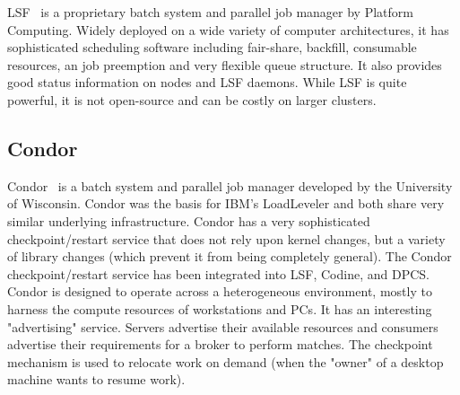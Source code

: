 LSF~\cite{LSF}
is a proprietary batch system and parallel job manager by 
Platform Computing. Widely deployed on a wide variety of computer 
architectures, it has sophisticated scheduling software including 
fair-share, backfill, consumable resources, an job preemption and 
very flexible queue structure.
It also provides good status information on nodes and LSF daemons.
While LSF is quite powerful, it is not open-source and can be costly on 
larger clusters.
%


\subsection*{Condor}

Condor~\cite{Condor,Litzkow88,Basney97}
is a batch system and parallel job manager 
developed by the University of Wisconsin. 
Condor was the basis for IBM's LoadLeveler and both share very similar 
underlying infrastructure. Condor has a very sophisticated checkpoint/restart 
service that does not rely upon kernel changes, but a variety of 
library changes (which prevent it from being completely general). The 
Condor checkpoint/restart service has been integrated into LSF, 
Codine, and DPCS. Condor is designed to operate across a 
heterogeneous environment, mostly to harness the compute resources of 
workstations and PCs. It has an interesting "advertising" service. 
Servers advertise their available resources and consumers advertise 
their requirements for a broker to perform matches. The checkpoint 
mechanism is used to relocate work on demand (when the "owner" of a 
desktop machine wants to resume work).

